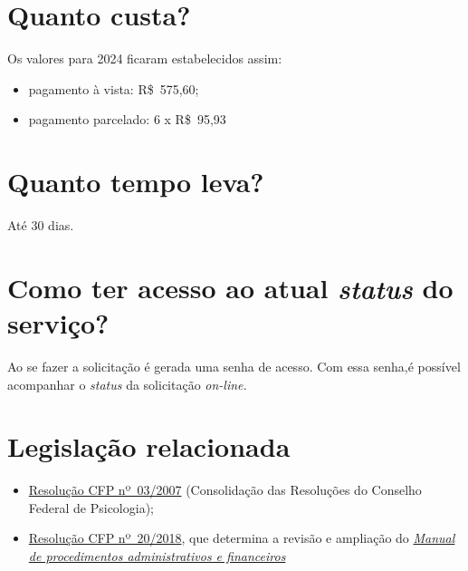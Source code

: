 \section{Quanto custa?}

Os valores para 2024 ficaram estabelecidos assim:

\begin{itemize}
  \item  pagamento à vista: R\$~575,60;
  \item  pagamento parcelado: 6 x R\$~95,93
\end{itemize}

\section{Quanto tempo leva?}

Até 30 dias.

\section{Como ter acesso ao atual \emph{status} do serviço?}

Ao se fazer a solicitação é gerada uma senha de acesso. Com essa senha,é possível acompanhar o \emph{status} da solicitação \emph{on-line.}

\section{Legislação relacionada}

\begin{itemize}
  \item  \href{https://atosoficiais.com.br/cfp/resolucao-administrativa-financeira-n-3-2007-institui-a-consolidacao-das-resolucoes-do-conselho-federal-de-psicologia?origin=instituicao&q=resolu\%C3\%A7\%C3\%A3o\%203/2007}{Resolução  CFP nº~03/2007} (Consolidação das Resoluções do Conselho Federal de  Psicologia);
  \item  \href{https://atosoficiais.com.br/cfp/resolucao-administrativa-financeira-n-20-2018-altera-o-manual-de-procedimentos-administrativo-e-financeiro-do-sistema-conselhos-de-psicologia-anexo-da-resolucao-cfp-n-202018-a-resolucao-cfp-n-03-2007-a-resolucao-cfp-n-16-2019-e-da-outras-providencias}{Resolução  CFP nº~20/2018}, que determina a revisão e ampliação do  \href{https://transparencia.cfp.org.br/wp-content/uploads/sites/7/2020/05/Manual-de-Procedimentos-Administrativos-e-Financeiro-CFP-RES-20.2018.pdf}{\emph{Manual  de procedimentos administrativos e financeiros}}
\end{itemize}

